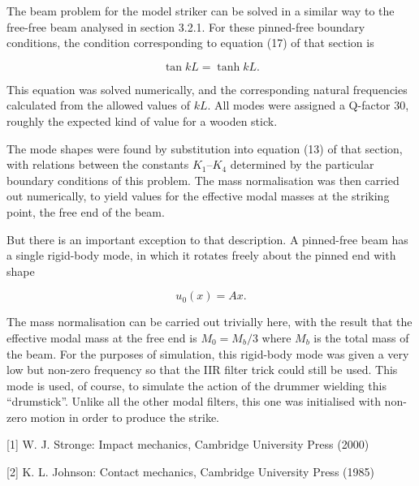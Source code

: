   The beam problem for the model striker can be solved in a similar way to the 
  free-free beam analysed in section 3.2.1. For these pinned-free boundary 
  conditions, the condition corresponding to equation (17) of that section is 

  $$\tan kL = \tanh kL . \tag{11}$$ 

  This equation was solved numerically, and the corresponding natural 
  frequencies calculated from the allowed values of $kL$. All modes were 
  assigned a Q-factor 30, roughly the expected kind of value for a wooden 
  stick. 

  The mode shapes were found by substitution into equation (13) of that 
  section, with relations between the constants $K_1$--$K_4$ determined by the 
  particular boundary conditions of this problem. The mass normalisation was 
  then carried out numerically, to yield values for the effective modal masses 
  at the striking point, the free end of the beam. 

  But there is an important exception to that description. A pinned-free beam 
  has a single rigid-body mode, in which it rotates freely about the pinned end 
  with shape 

  $$u_0(x)=A x . \tag{12}$$ 

  The mass normalisation can be carried out trivially here, with the result 
  that the effective modal mass at the free end is $M_0=M_b/3$ where $M_b$ is 
  the total mass of the beam. For the purposes of simulation, this rigid-body 
  mode was given a very low but non-zero frequency so that the IIR filter trick 
  could still be used. This mode is used, of course, to simulate the action of 
  the drummer wielding this ``drumstick''. Unlike all the other modal filters, 
  this one was initialised with non-zero motion in order to produce the strike. 

  \sectionreferences{}[1] W. J. Stronge: Impact mechanics, Cambridge University 
  Press (2000) 

  [2] K. L. Johnson: Contact mechanics, Cambridge University Press (1985) 
